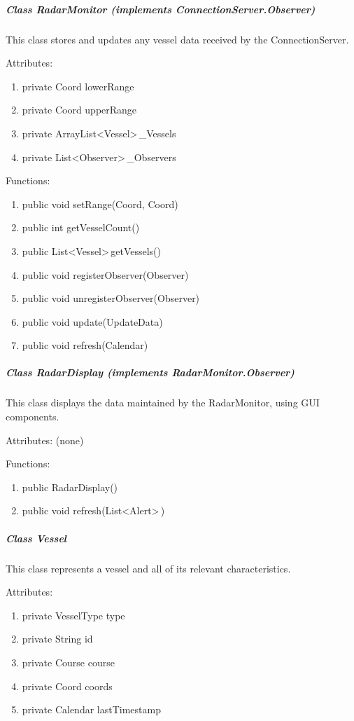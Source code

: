 \documentclass{article}
\begin{document}
\subparagraph{Class RadarMonitor (implements ConnectionServer.Observer)}
This class stores and updates any vessel data received by the ConnectionServer.

\vspace{0.5cm}
Attributes:
\begin{enumerate}
	\item private Coord lowerRange
    \item private Coord upperRange
    \item private ArrayList\textless Vessel\textgreater \,\_Vessels
    \item private List\textless Observer\textgreater \,\_Observers
\end {enumerate}

\vspace{0.5cm}
Functions:
\begin{enumerate}
	\item public void setRange(Coord, Coord)
	\item public int getVesselCount()
	\item public List\textless Vessel\textgreater \,getVessels()
	\item public void registerObserver(Observer)
	\item public void unregisterObserver(Observer)
	\item public void update(UpdateData)
	\item public void refresh(Calendar)
\end{enumerate}

\break
\subparagraph{Class RadarDisplay (implements RadarMonitor.Observer)}
This class displays the data maintained by the RadarMonitor, using GUI components.

\vspace{0.5cm}
Attributes: (none)

\vspace{0.5cm}
Functions:
\begin{enumerate}
	\item public RadarDisplay()
	\item public void refresh(List\textless Alert\textgreater \,)
\end{enumerate}

\subparagraph{Class Vessel}
This class represents a vessel and all of its relevant characteristics.

\vspace{0.5cm}
Attributes:
\begin{enumerate}
	\item private VesselType type
    \item private String id
    \item private Course course
    \item private Coord coords
    \item private Calendar lastTimestamp
\end {enumerate}
\end{document}
